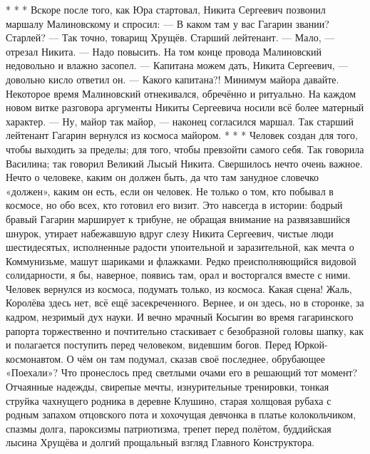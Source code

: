 *   *   *
Вскоре после того, как Юра стартовал, Никита Сергеевич позвонил маршалу Малиновскому и спросил:
— В каком там у вас Гагарин звании? Старлей?
— Так точно, товарищ Хрущёв. Старший лейтенант.
— Мало, — отрезал Никита. — Надо повысить.
На том конце провода Малиновский недовольно и влажно засопел.
— Капитана можем дать, Никита Сергеевич, — довольно кисло ответил он.
— Какого капитана?! Минимум майора давайте.
Некоторое время Малиновский отнекивался, обречённо и ритуально. На каждом новом витке разговора аргументы Никиты Сергеевича носили всё более матерный характер. 
— Ну, майор так майор, — наконец согласился маршал. 
Так старший лейтенант Гагарин вернулся из космоса майором.
*   *   *
Человек создан для того, чтобы выходить за пределы; для того, чтобы превзойти самого себя. Так говорила Василина; так говорил Великий Лысый Никита.
Свершилось нечто очень важное. Нечто о человеке, каким он должен быть, да что там занудное словечко «должен», каким он есть, если он человек. Не только о том, кто побывал в космосе, но обо всех, кто готовил его визит.
Это навсегда в истории: бодрый бравый Гагарин марширует к трибуне, не обращая внимание на развязавшийся шнурок, утирает набежавшую вдруг слезу Никита Сергеевич, чистые люди шестидесятых, исполненные радости упоительной и заразительной, как мечта о Коммунизьме, машут шариками и флажками.
Редко преисполняющийся видовой солидарности, я бы, наверное, появись там, орал и восторгался вместе с ними. Человек вернулся из космоса, подумать только, из космоса. Какая сцена! Жаль, Королёва здесь нет, всё ещё засекреченного. Вернее, и он здесь, но в сторонке, за кадром, незримый дух науки.
И вечно мрачный Косыгин во время гагаринского рапорта торжественно и почтительно стаскивает с безобразной головы шапку, как и полагается поступить перед человеком, видевшим богов. 
Перед Юркой-космонавтом. О чём он там подумал, сказав своё последнее, обрубающее «Поехали»? Что пронеслось пред светлыми очами его в решающий тот момент? Отчаянные надежды, свирепые мечты, изнурительные тренировки, тонкая струйка чахнущего родника в деревне Клушино, старая холщовая рубаха с родным запахом отцовского пота и хохочущая девчонка в платье колокольчиком, спазмы долга, пароксизмы патриотизма, трепет перед полётом, буддийская лысина Хрущёва и долгий прощальный взгляд Главного Конструктора.
